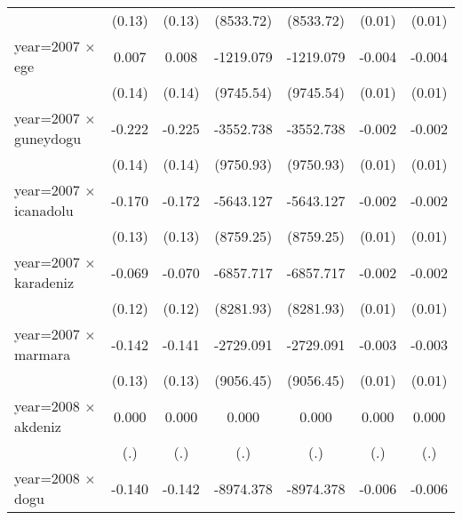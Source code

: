 {\begin{tabular}{l*{6}{c}}
                    &      (0.13)         &      (0.13)         &   (8533.72)         &   (8533.72)         &      (0.01)         &      (0.01)         \\
year=2007 $\times$ ege&       0.007         &       0.008         &   -1219.079         &   -1219.079         &      -0.004         &      -0.004         \\
                    &      (0.14)         &      (0.14)         &   (9745.54)         &   (9745.54)         &      (0.01)         &      (0.01)         \\
year=2007 $\times$ guneydogu&      -0.222         &      -0.225         &   -3552.738         &   -3552.738         &      -0.002         &      -0.002         \\
                    &      (0.14)         &      (0.14)         &   (9750.93)         &   (9750.93)         &      (0.01)         &      (0.01)         \\
year=2007 $\times$ icanadolu&      -0.170         &      -0.172         &   -5643.127         &   -5643.127         &      -0.002         &      -0.002         \\
                    &      (0.13)         &      (0.13)         &   (8759.25)         &   (8759.25)         &      (0.01)         &      (0.01)         \\
year=2007 $\times$ karadeniz&      -0.069         &      -0.070         &   -6857.717         &   -6857.717         &      -0.002         &      -0.002         \\
                    &      (0.12)         &      (0.12)         &   (8281.93)         &   (8281.93)         &      (0.01)         &      (0.01)         \\
year=2007 $\times$ marmara&      -0.142         &      -0.141         &   -2729.091         &   -2729.091         &      -0.003         &      -0.003         \\
                    &      (0.13)         &      (0.13)         &   (9056.45)         &   (9056.45)         &      (0.01)         &      (0.01)         \\
year=2008 $\times$ akdeniz&       0.000         &       0.000         &       0.000         &       0.000         &       0.000         &       0.000         \\
                    &         (.)         &         (.)         &         (.)         &         (.)         &         (.)         &         (.)         \\
year=2008 $\times$ dogu&      -0.140         &      -0.142         &   -8974.378         &   -8974.378         &      -0.006         &      -0.006         \\

\end{tabular}}
